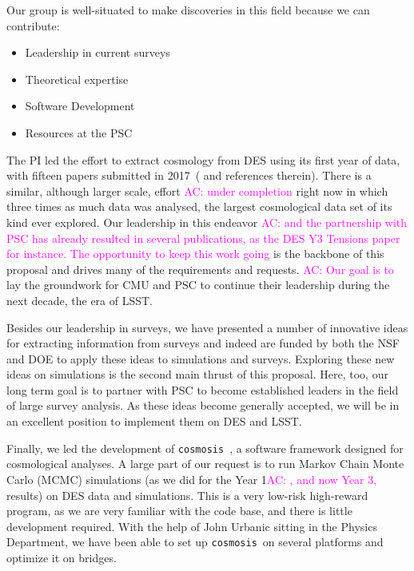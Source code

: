 \documentclass[12pt]{article}
\newcommand{\acampos}[1]{\textcolor{magenta}{AC: #1}}
\begin{document}
\begin{small}
Our group is well-situated to make discoveries in this field because we can contribute:
\begin{itemize}
\item Leadership in current surveys
\item Theoretical expertise
\item Software Development
\item Resources at the PSC
\end{itemize} 
The PI led the effort to extract cosmology from DES using its first year of data, with fifteen papers submitted in 2017~(\cite{Abbott:2017wau} and references therein). There is a similar, although larger scale, effort \acampos{under completion} right now in which three times as much data was analysed, the largest cosmological data set of its kind ever explored. Our leadership in this endeavor \acampos{and the partnership with PSC has already resulted in several publications, as the DES Y3 Tensions paper~\cite{y3-tensions} for instance. The opportunity to keep this work going} is the backbone of this proposal and drives many of the requirements and requests. %
\acampos{Our goal is to} lay the groundwork for CMU and PSC to continue their leadership during the next decade, the era of LSST.

Besides our leadership in surveys, we have presented a number of innovative ideas for extracting information from surveys and indeed are funded by both the NSF and DOE to apply these ideas to simulations and surveys. Exploring these new ideas on simulations is the second main thrust of this proposal. Here, too, our long term goal is to partner with PSC to become established leaders in the field of large survey analysis. As these ideas become generally accepted, we will be in an excellent position to implement them on DES and LSST.
\newcommand\cosmosis{{\tt cosmosis}}

Finally, we led the development of {\tt cosmosis}~\cite{Zuntz:2014csq}, a software framework designed for cosmological analyses. A large part of our request is to run Markov Chain Monte Carlo (MCMC) simulations (as we did for the Year 1\acampos{, and now Year 3,} results) on DES data and simulations. This is a very low-risk high-reward program, as we are very familiar with the code base, and there is little development required. With the help of John Urbanic sitting in the Physics Department, we have been able to set up \cosmosis\ on several platforms and optimize it on bridges.


\end{small}
\end{document}
